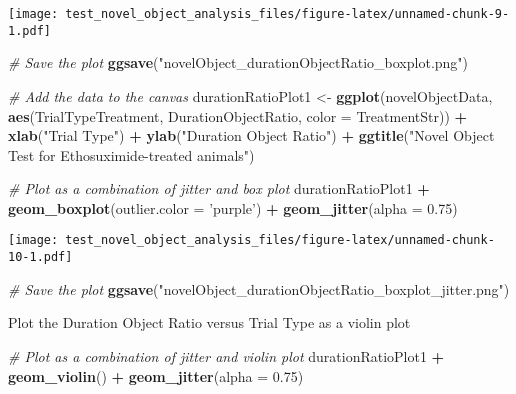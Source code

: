 \documentclass[]{article}
\newenvironment{Shaded}{\begin{snugshade}}{\end{snugshade}}
\newcommand{\KeywordTok}[1]{\textcolor[rgb]{0.13,0.29,0.53}{\textbf{#1}}}
\newcommand{\DataTypeTok}[1]{\textcolor[rgb]{0.13,0.29,0.53}{#1}}
\newcommand{\FloatTok}[1]{\textcolor[rgb]{0.00,0.00,0.81}{#1}}
\newcommand{\StringTok}[1]{\textcolor[rgb]{0.31,0.60,0.02}{#1}}
\newcommand{\CommentTok}[1]{\textcolor[rgb]{0.56,0.35,0.01}{\textit{#1}}}
\newcommand{\OperatorTok}[1]{\textcolor[rgb]{0.81,0.36,0.00}{\textbf{#1}}}
\newcommand{\NormalTok}[1]{#1}
\begin{document}
\texttt{[image: test\_novel\_object\_analysis\_files/figure-latex/unnamed-chunk-9-1.pdf]}

\begin{Shaded}
\begin{Highlighting}[]
\CommentTok{# Save the plot}
\KeywordTok{ggsave}\NormalTok{(}\StringTok{"novelObject_durationObjectRatio_boxplot.png"}\NormalTok{)}
\end{Highlighting}
\end{Shaded}

\begin{Shaded}
\begin{Highlighting}[]
\CommentTok{# Add the data to the canvas}
\NormalTok{durationRatioPlot1 <-}\StringTok{ }
\StringTok{    }\KeywordTok{ggplot}\NormalTok{(novelObjectData, }\KeywordTok{aes}\NormalTok{(TrialTypeTreatment, DurationObjectRatio, }\DataTypeTok{color =}\NormalTok{ TreatmentStr)) }\OperatorTok{+}
\StringTok{    }\KeywordTok{xlab}\NormalTok{(}\StringTok{"Trial Type"}\NormalTok{) }\OperatorTok{+}\StringTok{ }\KeywordTok{ylab}\NormalTok{(}\StringTok{"Duration Object Ratio"}\NormalTok{) }\OperatorTok{+}
\StringTok{    }\KeywordTok{ggtitle}\NormalTok{(}\StringTok{"Novel Object Test for Ethosuximide-treated animals"}\NormalTok{)}

\CommentTok{# Plot as a combination of jitter and box plot}
\NormalTok{durationRatioPlot1 }\OperatorTok{+}\StringTok{ }\KeywordTok{geom_boxplot}\NormalTok{(}\DataTypeTok{outlier.color =} \StringTok{'purple'}\NormalTok{) }\OperatorTok{+}
\StringTok{    }\KeywordTok{geom_jitter}\NormalTok{(}\DataTypeTok{alpha =} \FloatTok{0.75}\NormalTok{)}
\end{Highlighting}
\end{Shaded}

\texttt{[image: test\_novel\_object\_analysis\_files/figure-latex/unnamed-chunk-10-1.pdf]}

\begin{Shaded}
\begin{Highlighting}[]
\CommentTok{# Save the plot}
\KeywordTok{ggsave}\NormalTok{(}\StringTok{"novelObject_durationObjectRatio_boxplot_jitter.png"}\NormalTok{)}
\end{Highlighting}
\end{Shaded}

Plot the Duration Object Ratio versus Trial Type as a violin plot

\begin{Shaded}
\begin{Highlighting}[]
\CommentTok{# Plot as a combination of jitter and violin plot}
\NormalTok{durationRatioPlot1 }\OperatorTok{+}\StringTok{ }\KeywordTok{geom_violin}\NormalTok{() }\OperatorTok{+}
\StringTok{    }\KeywordTok{geom_jitter}\NormalTok{(}\DataTypeTok{alpha =} \FloatTok{0.75}\NormalTok{)}
\end{Highlighting}
\end{Shaded}
\end{document}
